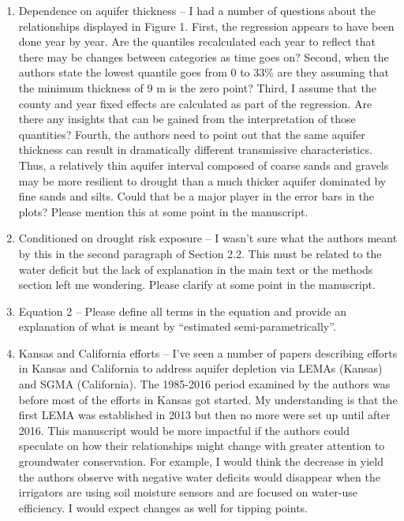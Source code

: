 \documentclass[
]{article}
\begin{document}
\begin{enumerate}
\def\labelenumi{\arabic{enumi}.}
\setcounter{enumi}{1}
\item
  Dependence on aquifer thickness -- I had a number of questions about
  the relationships displayed in Figure 1. First, the regression appears
  to have been done year by year. Are the quantiles recalculated each
  year to reflect that there may be changes between categories as time
  goes on? Second, when the authors state the lowest quantile goes from
  0 to 33\% are they assuming that the minimum thickness of 9 m is the
  zero point? Third, I assume that the county and year fixed effects are
  calculated as part of the regression. Are there any insights that can
  be gained from the interpretation of those quantities? Fourth, the
  authors need to point out that the same aquifer thickness can result
  in dramatically different transmissive characteristics. Thus, a
  relatively thin aquifer interval composed of coarse sands and gravels
  may be more resilient to drought than a much thicker aquifer dominated
  by fine sands and silts. Could that be a major player in the error
  bars in the plots? Please mention this at some point in the
  manuscript.
\item
  Conditioned on drought risk exposure -- I wasn't sure what the authors
  meant by this in the second paragraph of Section 2.2. This must be
  related to the water deficit but the lack of explanation in the main
  text or the methods section left me wondering. Please clarify at some
  point in the manuscript.
\item
  Equation 2 -- Please define all terms in the equation and provide an
  explanation of what is meant by ``estimated semi-parametrically''.
\item
  Kansas and California efforts -- I've seen a number of papers
  describing efforts in Kansas and California to address aquifer
  depletion via LEMAs (Kansas) and SGMA (California). The 1985-2016
  period examined by the authors was before most of the efforts in
  Kansas got started. My understanding is that the first LEMA was
  established in 2013 but then no more were set up until after 2016.
  This manuscript would be more impactful if the authors could speculate
  on how their relationships might change with greater attention to
  groundwater conservation. For example, I would think the decrease in
  yield the authors observe with negative water deficits would disappear
  when the irrigators are using soil moisture sensors and are focused on
  water-use efficiency. I would expect changes as well for tipping
  points.
\end{enumerate}
\end{document}

